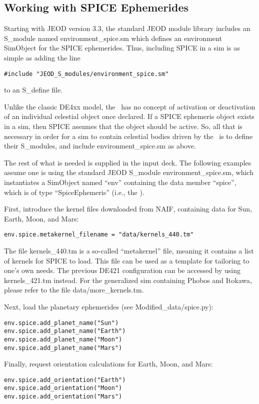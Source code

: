 \subsection{Working with SPICE Ephemerides}\label{subsec:spice_ephelmerides}
Starting with JEOD version 3.3, the standard JEOD module library includes
an S\_module named environment\_spice.sm which defines an environment
SimObject for the SPICE ephemerides. Thus, including SPICE in a sim is
as simple as adding the line
\begin{verbatim}
#include "JEOD_S_modules/environment_spice.sm"
\end{verbatim}
to an S\_define file.

Unlike the classic DE4xx model, the \SpiceDesc\ has no concept of activation
or deactivation of an individual celestial object once declared.  If a
SPICE ephemeris object exists in a sim, then SPICE assumes that the object
should be active.  So, all that is necessary in order for a sim to contain
celestial bodies driven by the \SpiceDesc\ is to define their S\_modules,
and include environment\_spice.sm as above.

The rest of what is needed is supplied in the input deck. The following
examples assume one is using the standard JEOD S\_module environment\_spice.sm,
which instantiates a SimObject named ``env'' containing the data member
``spice'', which is of type ``SpiceEphemeris'' (i.e., the \SpiceDesc).

First, introduce the kernel files downloaded from NAIF, containing data
for Sun, Earth, Moon, and Mars:
\begin{verbatim}
env.spice.metakernel_filename = "data/kernels_440.tm"
\end{verbatim}
The file kernels\_440.tm is a so-called ``metakernel'' file, meaning it contains
a list of kernels for SPICE to load. This file can be used as a template for
tailoring to one's own needs. The previous DE421 configuration can be accessed
by using kernels\_421.tm instead. For the generalized sim containing Phobos and
Itokawa, please refer to the file data/more\_kernels.tm.

Next, load the planetary ephemerides (see Modified\_data/spice.py):
\begin{verbatim}
env.spice.add_planet_name("Sun")
env.spice.add_planet_name("Earth")
env.spice.add_planet_name("Moon")
env.spice.add_planet_name("Mars")
\end{verbatim}

Finally, request orientation calculations for Earth, Moon, and Mars:
\begin{verbatim}
env.spice.add_orientation("Earth")
env.spice.add_orientation("Moon")
env.spice.add_orientation("Mars")
\end{verbatim}
